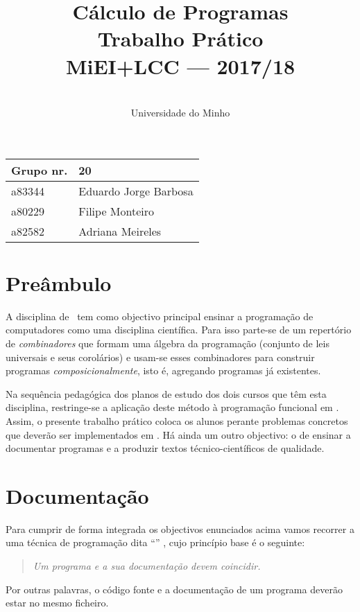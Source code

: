\documentclass[a4paper]{article}
\title{
       	    Cálculo de Programas
\\
       	Trabalho Prático
\\
       	MiEI+LCC --- 2017/18
}
\author{
       	\dium
\\
       	Universidade do Minho
}
\date\mydate
\begin{document}
\maketitle

\begin{center}\large
\begin{tabular}{ll}
\textbf{Grupo} nr. & 20
\\\hline
a83344 & Eduardo Jorge Barbosa
\\
a80229 & Filipe Monteiro
\\
a82582 & Adriana Meireles
\end{tabular}
\end{center}

\section{Preâmbulo}

A disciplina de \CP\ tem como objectivo principal ensinar
a progra\-mação de computadores como uma disciplina científica. Para isso
parte-se de um repertório de \emph{combinadores} que formam uma álgebra da
programação (conjunto de leis universais e seus corolários) e usam-se esses
combinadores para construir programas \emph{composicionalmente}, isto é,
agregando programas já existentes.

Na sequência pedagógica dos planos de estudo dos dois cursos que têm esta
disciplina, restringe-se a aplicação deste método à programação funcional
em \Haskell. Assim,
o presente trabalho prático coloca os alunos perante problemas
concretos que deverão ser implementados em \Haskell.
Há ainda um outro objectivo: o de ensinar a documentar programas e
a produzir textos técnico-científicos de qualidade.

\section{Documentação}
Para cumprir de forma integrada os objectivos enunciados acima vamos recorrer
a uma técnica de programa\-ção dita ``'' \cite{Kn92}, cujo
princípio base é o seguinte:
\begin{quote}\em
Um programa e a sua documentação devem coincidir.
\end{quote}
Por outras palavras, o código fonte e a documentação de um programa deverão estar no
mesmo ficheiro.
\end{document}
